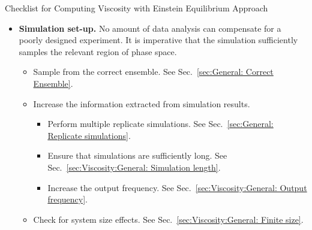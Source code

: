 \documentclass[9pt,bestpractices]{livecoms}
\begin{document}
\begin{Checklists*}[p!]
	\begin{checklist}{Checklist for Computing Viscosity with Einstein Equilibrium Approach}
		\begin{itemize}
			\item
			\textbf{Simulation set-up.} No amount of data analysis can compensate for a poorly designed experiment. It is imperative that the simulation sufficiently samples the relevant region of phase space.
			\begin{itemize}
				\item Sample from the correct ensemble. See Sec.\ \ref{sec:General: Correct Ensemble}.
				\item Increase the information extracted from simulation results.
				\begin{itemize}
					\item Perform multiple replicate simulations. See Sec.\ \ref{sec:General: Replicate simulations}.
					\item Ensure that simulations are sufficiently long. See Sec.\ \ref{sec:Viscosity:General: Simulation length}.
					\item Increase the output frequency. See Sec.\ \ref{sec:Viscosity:General: Output frequency}.
				\end{itemize}
				\item Check for system size effects. See Sec.\ \ref{sec:Viscosity:General: Finite size}.
			\end{itemize}
			\vspace{-0.325\baselineskip} %


\end{itemize}
\end{checklist}
\end{Checklists*}
\end{document}
